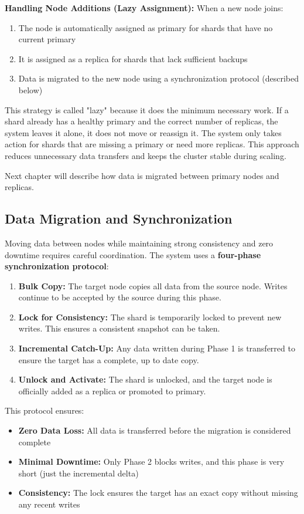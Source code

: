 \documentclass[shortabstract]{iithesis}
\begin{document}
\textbf{Handling Node Additions (Lazy Assignment):} When a new node joins:
\begin{enumerate}
    \item The node is automatically assigned as primary for shards that have no current primary
    \item It is assigned as a replica for shards that lack sufficient backups
    \item Data is migrated to the new node using a synchronization protocol (described below)
\end{enumerate}

This strategy is called "lazy" because it does the minimum necessary work. If a shard already has a healthy primary and the correct number of replicas, the system leaves it alone, it does not move or reassign it. The system only takes action for shards that are missing a primary or need more replicas. This approach reduces unnecessary data transfers and keeps the cluster stable during scaling.

Next chapter will describe how data is migrated between primary nodes and replicas.

\subsection{Data Migration and Synchronization}

Moving data between nodes while maintaining strong consistency and zero downtime requires careful coordination. The system uses a \textbf{four-phase synchronization protocol}:

\begin{enumerate}
    \item \textbf{Bulk Copy:} The target node copies all data from the source node. Writes continue to be accepted by the source during this phase.
    \item \textbf{Lock for Consistency:} The shard is temporarily locked to prevent new writes. This ensures a consistent snapshot can be taken.
    \item \textbf{Incremental Catch-Up:} Any data written during Phase 1 is transferred to ensure the target has a complete, up to date copy.
    \item \textbf{Unlock and Activate:} The shard is unlocked, and the target node is officially added as a replica or promoted to primary.
\end{enumerate}

This protocol ensures:
\begin{itemize}
    \item \textbf{Zero Data Loss:} All data is transferred before the migration is considered complete
    \item \textbf{Minimal Downtime:} Only Phase 2 blocks writes, and this phase is very short (just the incremental delta)
    \item \textbf{Consistency:} The lock ensures the target has an exact copy without missing any recent writes
\end{itemize}
\end{document}

